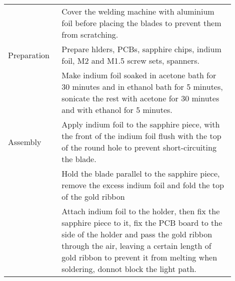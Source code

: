 \begin{table}
\begin{tabular}{p{0.2\linewidth}p{0.7\linewidth}}
                     & Cover the welding machine with aluminium foil before placing the blades to prevent them from scratching.                                                                                                                                                                   \\
        Preparation  & Prepare hlders, PCBs, sapphire chips, indium foil, M2 and M1.5 screw sets, spanners.                                                                                                                                                                                       \\
                     & Make indium foil soaked in acetone bath for 30 minutes and in ethanol bath for 5 minutes, sonicate the rest with acetone for 30 minutes and with ethanol for 5 minutes.                                                                                                    \\
        Assembly     & Apply indium foil to the sapphire piece, with the front of the indium foil flush with the top of the round hole to prevent short-circuiting the blade.                                                                                                                     \\
                     & Hold the blade parallel to the sapphire piece, remove the excess indium foil and fold the top of the gold ribbon                                                                                                                                                           \\
                     & Attach indium foil to the holder, then fix the sapphire piece to it, fix the PCB board to the side of the holder and pass the gold ribbon through the air, leaving a certain length of gold ribbon to prevent it from melting when soldering, donnot block the light path. \\
        \bottomrule
    \end{tabular}
\end{table}


